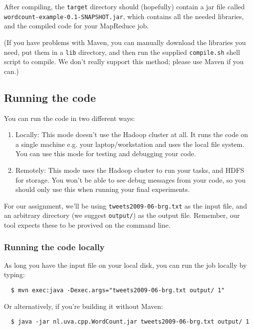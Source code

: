 \documentclass[a4paper,11pt]{article}
\begin{document}
  After compiling, the \texttt{target} directory should (hopefully) contain a jar file called\\ \texttt{wordcount-example-0.1-SNAPSHOT.jar}, which contains
  all the needed libraries, and the compiled code for your MapReduce job.

  (If you have problems with Maven, you can manually download the libraries you need, put them in a \texttt{lib} directory, and then run the supplied
  \texttt{compile.sh} shell script to compile. We don't really support this method; please use Maven if you can.)

  \subsection{Running the code}

  You can run the code in two different ways:

  \begin{enumerate}
    \item Locally: This mode doesn't use the Hadoop cluster at all. It runs the code on a single machine e.g. your laptop/workstation and uses the local file system. You can use this mode for testing and debugging your code.
    \item Remotely: This mode uses the Hadoop cluster to run your tasks, and HDFS for storage. You won't be able to see debug messages from your code, so you should only use this when running your final experiments.
  \end{enumerate}

For our assignment, we'll be using \texttt{tweets2009-06-brg.txt} as the input
file, and an arbitrary directory (we suggest \texttt{output/}) as the output file. Remember, our tool
expects these to be provived on the command line.

\subsubsection{Running the code locally}

As long you have the input file on your local disk, you can run the job locally by typing:

\begin{lstlisting}
  $ mvn exec:java -Dexec.args="tweets2009-06-brg.txt output/ 1"
\end{lstlisting}

Or alternatively, if you're building it without Maven:

\begin{lstlisting}
  $ java -jar nl.uva.cpp.WordCount.jar tweets2009-06-brg.txt output/ 1 
\end{lstlisting}
\end{document}

